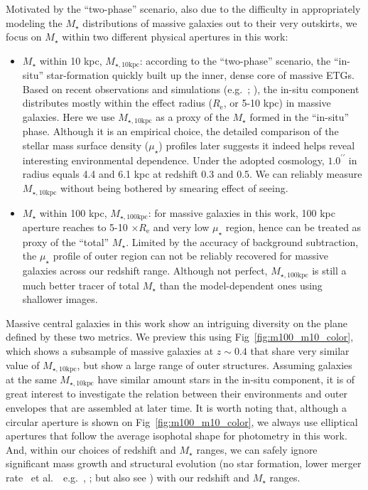 \documentclass[a4paper,fleqn,usenatbib]{mnras}
\def\arcsec{{\prime\prime}}
\def\etal{{\ et al.~}}
\def\mstar{{$M_{\star}$}}
\def\minn{{$M_{\star,10\mathrm{kpc}}$}}
\def\mtot{{$M_{\star,100\mathrm{kpc}}$}}
\def\mden{{$\mu_{\star}$}}
\begin{document}
    Motivated by the ``two-phase'' scenario, also due to the difficulty in 
    appropriately modeling the \mstar{} distributions of massive galaxies out to 
    their very outskirts, we focus on \mstar{} within two different physical apertures 
    in this work:
    
    \begin{itemize}
        \item \mstar{} within 10 kpc, \minn{}: according to the ``two-phase'' 
            scenario, the ``in-situ'' star-formation quickly built up the inner, dense 
            core of massive ETGs.  
            Based on recent observations and simulations (e.g.~\citealt{vanDokkum2010}; 
            \citealt{RodriguezGomez2016}), the in-situ 
            component distributes mostly within the effect radius ($R_{\mathrm{e}}$, 
            or 5-10 kpc) in massive galaxies.  
            Here we use \minn{} as a proxy of the \mstar{} formed in the ``in-situ''
            phase.  Although it is an empirical choice, the detailed comparison of 
            the stellar mass surface density (\mden{}) profiles later suggests it indeed 
            helps reveal interesting environmental dependence.  
            Under the adopted cosmology, $1.0^{\arcsec}$ in radius equals 4.4 and 6.1 kpc 
            at redshift 0.3 and 0.5.  
            We can reliably measure \minn{} without being bothered by smearing effect
            of seeing.
        \item \mstar{} within 100 kpc, \mtot{}: for massive galaxies in this work, 
            100 kpc aperture reaches to 5-10 $\times R_{\mathrm{e}}$ and very low 
            \mden{} region, hence can be treated as proxy of the ``total'' \mstar{}. 
            Limited by the accuracy of background subtraction, the \mden{} profile 
            of outer region can not be reliably recovered for massive galaxies across 
            our redshift range. 
            Although not perfect, \mtot{} is still a much better tracer of total 
            \mstar{} than the model-dependent ones using shallower images.
    \end{itemize}
    
    Massive central galaxies in this work show an intriguing diversity on the 
    plane defined by these two metrics.  
    We preview this using Fig~\ref{fig:m100_m10_color}, which shows a subsample of 
    massive galaxies at $z\sim 0.4$ that share very similar value of \minn{}, but show 
    a large range of outer structures. 
    Assuming galaxies at the same \minn{} have similar amount stars in the in-situ 
    component, it is of great interest to investigate the relation between their 
    environments and outer envelopes that are assembled at later time. 
    It is worth noting that, although a circular aperture is shown on 
    Fig~\ref{fig:m100_m10_color}, we always use elliptical apertures that follow the 
    average isophotal shape for photometry in this work.
    And, within our choices of redshift and \mstar{} ranges, we can safely ignore 
    significant mass growth and structural evolution 
    (no star formation, lower merger rate \etal~e.g.\ \citealt{Bellstedt2016},
    \citealt{Inagaki2015}; but also see \citealt{Bai2014}) 
    with our redshift and \mstar{} ranges. 
\end{document}
